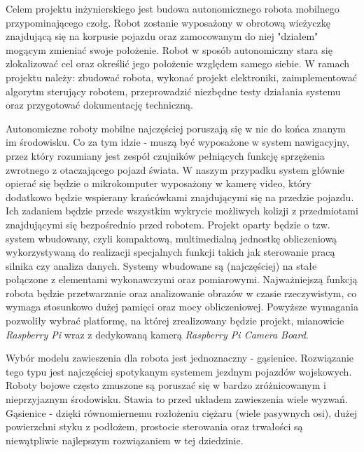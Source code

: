 Celem projektu inżynierskiego jest budowa autonomicznego robota mobilnego przypominającego czołg. Robot zostanie wyposażony w obrotową wieżyczkę znajdującą się na korpusie pojazdu oraz zamocowanym do niej "działem" mogącym zmieniać swoje położenie. Robot w sposób autonomiczny stara się zlokalizować cel oraz określić jego położenie względem samego siebie. W ramach projektu należy: zbudować robota, wykonać projekt elektroniki, zaimplementować algorytm sterujący robotem, przeprowadzić niezbędne testy działania systemu oraz przygotować dokumentację techniczną.

Autonomiczne roboty mobilne najczęściej poruszają się w nie do końca znanym im środowisku. Co za tym idzie - muszą być wyposażone w system nawigacyjny, przez który rozumiany jest zespół czujników pełniących funkcję sprzężenia zwrotnego z otaczającego pojazd świata. W naszym przypadku system głównie opierać się będzie o mikrokomputer wyposażony w kamerę video, który dodatkowo będzie wspierany krańcówkami znajdującymi się na przedzie pojazdu. Ich zadaniem będzie przede wszystkim wykrycie możliwych kolizji z przedmiotami znajdującymi się bezpośrednio przed robotem. Projekt oparty będzie o tzw. system wbudowany, czyli kompaktową, multimedialną jednostkę obliczeniową wykorzystywaną do realizacji specjalnych funkcji takich jak sterowanie pracą silnika czy analiza danych. Systemy wbudowane są (najczęściej) na stałe połączone z elementami wykonawczymi oraz pomiarowymi. Najważniejszą funkcją robota będzie przetwarzanie oraz analizowanie obrazów w czasie rzeczywistym, co wymaga stosunkowo dużej pamięci oraz mocy obliczeniowej. Powyższe wymagania pozwoliły wybrać platformę, na której zrealizowany będzie projekt, mianowicie \textit{Raspberry Pi} wraz z dedykowaną kamerą \textit{Raspberry Pi Camera Board}. 

Wybór modelu zawieszenia dla robota jest jednoznaczny - gąsienice. Rozwiązanie tego typu jest najczęściej spotykanym systemem jezdnym pojazdów wojskowych. Roboty bojowe często zmuszone są poruszać się w bardzo zróżnicowanym i nieprzyjaznym środowisku. Stawia to przed układem zawieszenia wiele wyzwań.  Gąsienice - dzięki równomiernemu rozłożeniu ciężaru (wiele pasywnych osi), dużej powierzchni styku z podłożem, prostocie sterowania oraz trwałości są niewątpliwie najlepszym rozwiązaniem w tej dziedzinie.

